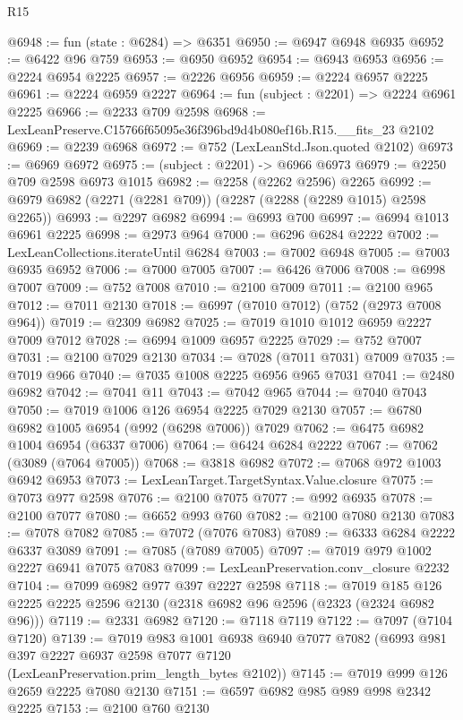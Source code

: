 \begin{lexlean}{R15}
\begin{coremodule}
@6948 := fun (state : @6284) => @6351
@6950 := @6947 @6948 @6935
@6952 := @6422 @96 @759
@6953 := @6950 @6952
@6954 := @6943 @6953
@6956 := @2224 @6954 @2225
@6957 := @2226 @6956
@6959 := @2224 @6957 @2225
@6961 := @2224 @6959 @2227
@6964 := fun (subject : @2201) => @2224 @6961 @2225
@6966 := @2233 @709 @2598
@6968 := LexLeanPreserve.C15766f65095e36f396bd9d4b080ef16b.R15.__fits_23 @2102
@6969 := @2239 @6968
@6972 := @752 (LexLeanStd.Json.quoted @2102)
@6973 := @6969 @6972
@6975 := (subject : @2201) -> @6966 @6973
@6979 := @2250 @709 @2598 @6973 @1015
@6982 := @2258 (@2262 @2596) @2265
@6992 := @6979 @6982 (@2271 (@2281 @709)) (@2287 (@2288 (@2289 @1015) @2598 @2265))
@6993 := @2297 @6982
@6994 := @6993 @700
@6997 := @6994 @1013 @6961 @2225
@6998 := @2973 @964
@7000 := @6296 @6284 @2222
@7002 := LexLeanCollections.iterateUntil @6284
@7003 := @7002 @6948
@7005 := @7003 @6935 @6952
@7006 := @7000 @7005
@7007 := @6426 @7006
@7008 := @6998 @7007
@7009 := @752 @7008
@7010 := @2100 @7009
@7011 := @2100 @965
@7012 := @7011 @2130
@7018 := @6997 (@7010 @7012) (@752 (@2973 @7008 @964))
@7019 := @2309 @6982
@7025 := @7019 @1010 @1012 @6959 @2227 @7009 @7012
@7028 := @6994 @1009 @6957 @2225
@7029 := @752 @7007
@7031 := @2100 @7029 @2130
@7034 := @7028 (@7011 @7031) @7009
@7035 := @7019 @966
@7040 := @7035 @1008 @2225 @6956 @965 @7031
@7041 := @2480 @6982
@7042 := @7041 @11
@7043 := @7042 @965
@7044 := @7040 @7043
@7050 := @7019 @1006 @126 @6954 @2225 @7029 @2130
@7057 := @6780 @6982 @1005 @6954 (@992 (@6298 @7006)) @7029
@7062 := @6475 @6982 @1004 @6954 (@6337 @7006)
@7064 := @6424 @6284 @2222
@7067 := @7062 (@3089 (@7064 @7005))
@7068 := @3818 @6982
@7072 := @7068 @972 @1003 @6942 @6953
@7073 := LexLeanTarget.TargetSyntax.Value.closure
@7075 := @7073 @977 @2598
@7076 := @2100 @7075
@7077 := @992 @6935
@7078 := @2100 @7077
@7080 := @6652 @993 @760
@7082 := @2100 @7080 @2130
@7083 := @7078 @7082
@7085 := @7072 (@7076 @7083)
@7089 := @6333 @6284 @2222 @6337 @3089
@7091 := @7085 (@7089 @7005)
@7097 := @7019 @979 @1002 @2227 @6941 @7075 @7083
@7099 := LexLeanPreservation.conv_closure @2232
@7104 := @7099 @6982 @977 @397 @2227 @2598
@7118 := @7019 @185 @126 @2225 @2225 @2596 @2130 (@2318 @6982 @96 @2596 (@2323 (@2324 @6982 @96)))
@7119 := @2331 @6982
@7120 := @7118 @7119
@7122 := @7097 (@7104 @7120)
@7139 := @7019
    @983
    @1001
    @6938
    @6940
    @7077
    @7082
    (@6993 @981 @397 @2227 @6937 @2598 @7077 @7120 (LexLeanPreservation.prim_length_bytes @2102))
@7145 := @7019 @999 @126 @2659 @2225 @7080 @2130
@7151 := @6597 @6982 @985 @989 @998 @2342 @2225
@7153 := @2100 @760 @2130

\end{coremodule}
\end{lexlean}
